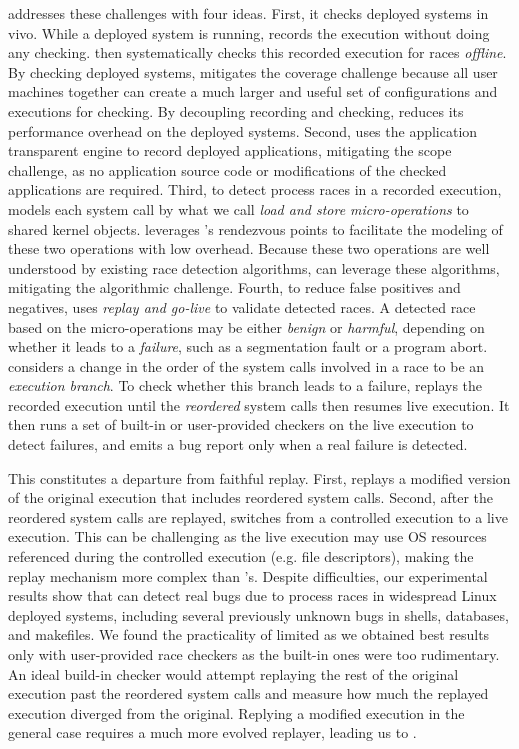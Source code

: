 \racepro addresses these challenges with four ideas.  First, it checks deployed
systems in vivo.  While a deployed system is running, \racepro records
the execution without doing any checking.  \racepro then systematically checks
this recorded execution for races \emph{offline}.  By checking deployed systems,
\racepro mitigates the coverage challenge because all user machines together can
create a much larger and useful set of configurations and executions for
checking.  By decoupling recording and checking, \racepro reduces its
performance overhead on the deployed systems.
Second, \racepro uses the application transparent \scribe engine to record
deployed applications, mitigating the scope challenge, as no application source
code or modifications of the checked applications are required.
Third, to detect process races in a recorded execution,
\racepro models each system call by what we call \emph{load and store
micro-operations} to shared kernel objects.  \racepro leverages \scribe's
rendezvous points to facilitate the modeling of these two operations with low
overhead.  Because these two operations are well understood by existing race
detection algorithms, \racepro can leverage these algorithms, mitigating the
algorithmic challenge.  Fourth, to reduce false positives and negatives,
\racepro uses \emph{replay and go-live} to validate detected races.  A
detected race based on the micro-operations may be either \emph{benign} or
\emph{harmful}, depending on whether it leads to a \emph{failure}, such as a
segmentation fault or a program abort.  \racepro considers a change in the order
of the system calls involved in a race to be an \emph{execution branch}.  To
check whether this branch leads to a failure, \racepro replays the recorded
execution until the \emph{reordered} system calls then resumes live execution.
It then runs a set of built-in or user-provided checkers on the live execution
to detect failures, and emits a bug report only when a real failure is detected.

This constitutes a departure from faithful replay. First, \racepro
replays a modified version of the original execution that includes reordered system calls.
Second, after the reordered system calls are replayed, \racepro switches from a
controlled execution to a live execution. This can be challenging as the live
execution may use OS resources referenced during the controlled execution (e.g.
file descriptors), making the replay mechanism more complex than \scribe's.
Despite difficulties, our experimental results show that \racepro can detect
real bugs due to process races in widespread Linux deployed systems, including
several previously unknown bugs in shells, databases, and makefiles.
We found the practicality of \racepro limited as we obtained
best results only with user-provided race checkers as the built-in ones
were too rudimentary. An ideal build-in checker would attempt replaying the rest
of the original execution past the reordered system calls and measure how much
the replayed execution diverged from the original. Replying a modified execution
in the general case requires a much more evolved replayer, leading us to \dora.

